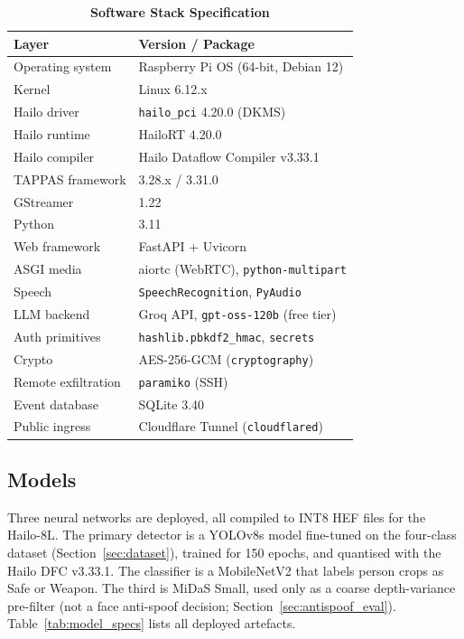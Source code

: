 \documentclass{ieeeaccess}
\begin{document}
\begin{table}[ht!]
\caption{\textbf{Software Stack Specification}}
\label{tab:sw_specs}
\setlength{\tabcolsep}{3pt}
\centering\footnotesize
\begin{tabular}{|l|p{4.3cm}|}
\hline
\textbf{Layer} & \textbf{Version / Package} \\
\hline
Operating system & Raspberry Pi OS (64-bit, Debian 12) \\
Kernel & Linux 6.12.x \\
Hailo driver & \texttt{hailo\_pci} 4.20.0 (DKMS) \\
Hailo runtime & HailoRT 4.20.0 \\
Hailo compiler & Hailo Dataflow Compiler v3.33.1 \\
TAPPAS framework & 3.28.x / 3.31.0 \\
GStreamer & 1.22 \\
Python & 3.11 \\
Web framework & FastAPI + Uvicorn \\
ASGI media & aiortc (WebRTC), \texttt{python-multipart} \\
Speech & \texttt{SpeechRecognition}, \texttt{PyAudio} \\
LLM backend & Groq API, \texttt{gpt-oss-120b} (free tier) \\
Auth primitives & \texttt{hashlib.pbkdf2\_hmac}, \texttt{secrets} \\
Crypto & AES-256-GCM (\texttt{cryptography}) \\
Remote exfiltration & \texttt{paramiko} (SSH) \\
Event database & SQLite 3.40 \\
Public ingress & Cloudflare Tunnel (\texttt{cloudflared}) \\
\hline
\end{tabular}
\end{table}

\subsection{Models}
Three neural networks are deployed, all compiled to INT8 HEF files for the Hailo-8L. The primary detector is a YOLOv8s model fine-tuned on the four-class dataset (Section~\ref{sec:dataset}), trained for 150 epochs, and quantised with the Hailo DFC v3.33.1. The classifier is a MobileNetV2 that labels person crops as Safe or Weapon. The third is MiDaS Small, used only as a coarse depth-variance pre-filter (not a face anti-spoof decision; Section~\ref{sec:antispoof_eval}). Table~\ref{tab:model_specs} lists all deployed artefacts.
\end{document}
